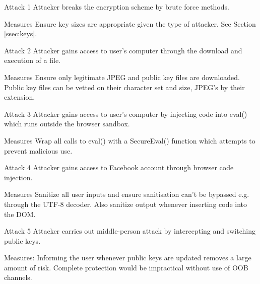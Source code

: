\begin{sdesc} \addtolength{\itemsep}{-0.5\baselineskip}
    \item[Attack 1] Attacker breaks the encryption scheme by brute force methods.
    \item[Measures] Ensure key sizes are appropriate given the type of attacker. See Section \ref{ssec:keys}.
\end{sdesc}

\begin{sdesc} \addtolength{\itemsep}{-0.5\baselineskip}
    \item[Attack 2] Attacker gains access to user's computer through the download and execution of a file.
    \item[Measures] Ensure only legitimate JPEG and public key files are downloaded. Public key files can be vetted on their character set and size, JPEG's by their extension.
\end{sdesc}

\begin{sdesc} \addtolength{\itemsep}{-0.5\baselineskip}
    \item[Attack 3] Attacker gains access to user's computer by injecting code into eval() which runs outside the browser sandbox.
    \item[Measures] Wrap all calls to eval() with a SecureEval() function which attempts to prevent malicious use. 
\end{sdesc}

\begin{sdesc} \addtolength{\itemsep}{-0.5\baselineskip}
    \item[Attack 4] Attacker gains access to Facebook account through browser code injection.
    \item[Measures] Sanitize all user inputs and ensure sanitisation can't be bypassed e.g. through the UTF-8 decoder\cite{utf8}. Also sanitize output whenever inserting code into the DOM.
\end{sdesc}

\begin{sdesc}\addtolength{\itemsep}{-0.5\baselineskip}
    \item[Attack 5] Attacker carries out middle-person attack by intercepting and switching public keys.
    \item[Measures:] Informing the user whenever public keys are updated removes a large amount of risk. Complete protection would be impractical without use of OOB channels.
\end{sdesc}

